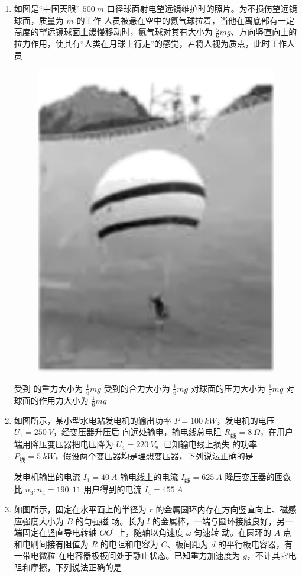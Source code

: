 \begin{enumerate}
\item
如图是“中国天眼” $ 500 \ m $ 口径球面射电望远镜维护时的照片。为不损伤望远镜球面，质量为 $ m $ 的工作
人员被悬在空中的氦气球拉着，当他在离底部有一定高度的望远镜球面上缓慢移动时，氦气球对其有大小为
$ \frac{ 5 }{ 6 } mg $、方向竖直向上的拉力作用，使其有“人类在月球上行走”的感觉，若将人视为质点，此时工作人员  
\begin{figure}[h!]
\centering
\includegraphics[width=0.15\linewidth]{picture/screenshot047}
\end{figure}


\fourchoices
{受到 的重力大小为 $ \frac{ 1 }{ 6 } mg $}
{受到的合力大小为 $ \frac{ 1 }{ 6 } mg $}
{对球面的压力大小为 $ \frac{ 1 }{ 6 } mg $}
{对球面的作用力大小为 $ \frac{ 1 }{ 6 } mg $}


\item
如图所示，某小型水电站发电机的输出功率 $ P=100 \ kW $，发电机的电压 $ U_{1} =250 \ V $，经变压器升压后
向远处输电，输电线总电阻 $ R _{ \text{线} } =8 \ \Omega $，在用户端用降压变压器把电压降为 $ U_4=220 \ V $。已知输电线上损失
的功率 $ P _{ \text{线} } =5 \ kW $，假设两个变压器均是理想变压器，下列说法正确的是  
\begin{figure}[h!]
\centering

\end{figure}


\fourchoices
{发电机输出的电流 $ I_{1} =40 \ A $}
{输电线上的电流 $ I_{ \text{线} }=625 \ A $}
{降压变压器的匝数比 $ n_{3}:n_4=190:11 $}
{用户得到的电流 $ I_4=455 \ A $}



\item
如图所示，固定在水平面上的半径为 $ r $ 的金属圆环内存在方向竖直向上、磁感应强度大小为 $ B $ 的匀强磁
场。长为 $ l $ 的金属棒，一端与圆环接触良好，另一端固定在竖直导电转轴 $ OO ^{\prime} $ 上，随轴以角速度 $ \omega $ 匀速转
动。在圆环的 $ A $ 点和电刷间接有阻值为 $ R $ 的电阻和电容为 $ C $、板间距为 $ d $ 的平行板电容器，有一带电微粒
在电容器极板间处于静止状态。已知重力加速度为 $ g $，不计其它电阻和摩擦，下列说法正确的是  
\begin{figure}[h!]
\centering

\end{figure}



\end{enumerate}
